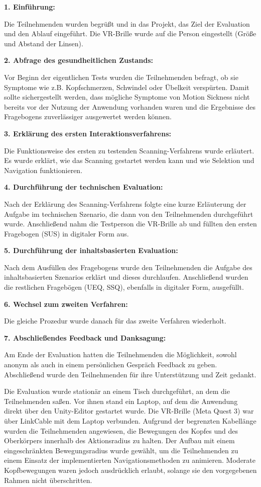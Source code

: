 {\normalfont \bfseries 1. Einführung:}

Die Teilnehmenden wurden begrüßt und in das Projekt, das Ziel der Evaluation und den Ablauf eingeführt. Die VR-Brille wurde auf die Person eingestellt (Größe und Abstand der Linsen). 

{\normalfont \bfseries 2. Abfrage des gesundheitlichen Zustands:}

Vor Beginn der eigentlichen Tests wurden die Teilnehmenden befragt, ob sie Symptome wie z.B. Kopfschmerzen, Schwindel oder Übelkeit verspürten. Damit sollte sichergestellt werden, dass mögliche Symptome von Motion Sickness nicht bereits vor der Nutzung der Anwendung vorhanden waren und die Ergebnisse des Fragebogens zuverlässiger ausgewertet werden können. 

{\normalfont \bfseries 3. Erklärung des ersten Interaktionsverfahrens:}

Die Funktionsweise des ersten zu testenden Scanning-Verfahrens wurde erläutert. Es wurde erklärt, wie das Scanning gestartet werden kann und wie Selektion und Navigation funktionieren. 

{\normalfont \bfseries 4. Durchführung der technischen Evaluation:}

Nach der Erklärung des Scanning-Verfahrens folgte eine kurze Erläuterung der Aufgabe im technischen Szenario, die dann von den Teilnehmenden durchgeführt wurde. Anschließend nahm die Testperson die VR-Brille ab und füllten den ersten Fragebogen (SUS) in digitaler Form aus. 

{\normalfont \bfseries 5. Durchführung der inhaltsbasierten Evaluation:}

Nach dem Ausfüllen des Fragebogens wurde den Teilnehmenden die Aufgabe des inhaltsbasierten Szenarios erklärt und dieses durchlaufen. Anschließend wurden die restlichen Fragebögen (UEQ, SSQ), ebenfalls in digitaler Form, ausgefüllt.

{\normalfont \bfseries 6. Wechsel zum zweiten Verfahren:}

Die gleiche Prozedur wurde danach für das zweite Verfahren wiederholt.

{\normalfont \bfseries 7. Abschließendes Feedback und Danksagung:}

Am Ende der Evaluation hatten die Teilnehmenden die Möglichkeit, sowohl anonym als auch in einem persönlichen Gespräch Feedback zu geben. Abschließend wurde den Teilnehmenden für ihre Unterstützung und Zeit gedankt. 

Die Evaluation wurde stationär an einem Tisch durchgeführt, an dem die Teilnehmenden saßen. Vor ihnen stand ein Laptop, auf dem die Anwendung direkt über den Unity-Editor gestartet wurde. Die VR-Brille (Meta Quest 3) war über LinkCable mit dem Laptop verbunden. Aufgrund der begrenzten Kabellänge wurden die Teilnehmenden angewiesen, die Bewegungen des Kopfes und des Oberkörpers innerhalb des Aktionsradius zu halten.  Der Aufbau mit einem eingeschränkten Bewegungsradius wurde gewählt, um die Teilnehmenden zu einem Einsatz der implementierten Navigationsmethoden zu animieren. Moderate Kopfbewegungen waren jedoch ausdrücklich erlaubt, solange sie den vorgegebenen Rahmen nicht überschritten.

